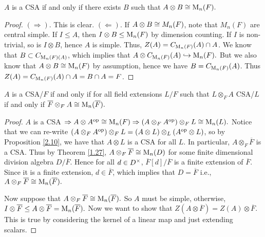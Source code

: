 \begin{prop}\label{2.10}
$A$ is a CSA if and only if there exists $B$ such that $A \otimes B \cong \operatorname{M}_n(F).$
\end{prop}
\begin{proof}
$(\Rightarrow).$ This is clear. $(\Leftarrow).$ If $A \otimes B \cong M_n(F)$, note that $M_n(F)$ are central simple. If $I \leq A$, then $I \otimes B \leq \operatorname{M}_n(F)$ by dimension counting. If $I$ is non-trivial, so is $I \otimes B$, hence $A $ is simple. Thus, $Z(A) = C_{\operatorname{M}_n(F)}(A) \cap A$. We know that $B \subset C_{\operatorname{M}_n(F)(A)}$, which implies that $A \otimes C_{\operatorname{M}_n(F)}(A) \hookrightarrow \operatorname{M}_n(F).$ But we also know that $A\otimes B \cong \operatorname{M}_n(F)$ by assumption, hence we have $B = C_{\operatorname{M}_n(F)}(A)$. Thus $Z(A) = C_{\operatorname{M}_n(F)}(A) \cap A = B \cap A = F$. 
\end{proof}

\begin{prop}\label{2.11}
$A$ is a CSA/$F$ if and only if for all field extensions $L/F$ such that $L \otimes_F A$ CSA/$L$ if and only if $\overline{F}\otimes_F A \cong \operatorname{M}_n(\overline{F}).$
\end{prop}

\begin{proof}
$A$ is a CSA $\Rightarrow A \otimes A^{\operatorname{op}} \cong \operatorname{M}_n(F) \Rightarrow (A \otimes_F A^{\operatorname{op}}) \otimes_F L \cong \operatorname{M}_n(L).$ Notice that we can re-write $(A \otimes_F A^{\operatorname{op}}) \otimes_F L = (A\otimes L)\otimes_L (A^{\operatorname{op}} \otimes L)$, so by Proposition \ref{2.10}, we have that $A\otimes L$ is a CSA for all $L$. In particular, $A\otimes_F \overline{F}$ is a CSA. Thus by Theorem \ref{1.27}, $A\otimes_F \overline{F} \cong \operatorname{M}_n(D)$ for some finite dimensional division algebra $D/\overline{F}$. Hence for all $d \in D^{\times}$, $\overline{F}[d]/\overline{F}$ is a finite extension of $\overline{F}$. Since it is a finite extension, $d \in \overline{F}$, which implies that $D = \overline{F}$ i.e., $A \otimes_F \overline{F} \cong \operatorname{M}_n(\overline{F}).$

Now suppose that $A \otimes_F \overline{F} \cong \operatorname{M}_n(\overline{F}).$ So $A$ must be simple, otherwise, $I \otimes \overline{F} \leq A \otimes \overline{F} = \operatorname{M}_n(\overline{F}).$ Now we want to show that $Z(A \otimes \overline{F}) = Z(A) \otimes \overline{F}$. This is true by considering the kernel of a linear map and just extending scalars.  
\end{proof}

